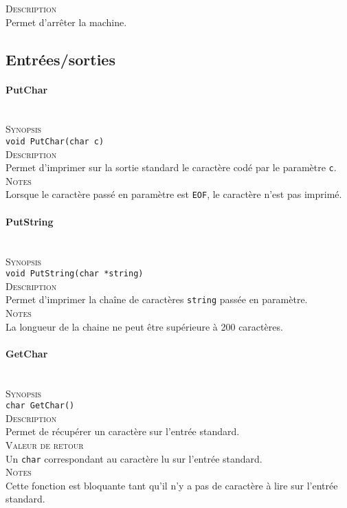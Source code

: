 \documentclass{report}
\newcommand{\myparagraph}[1]{\paragraph*{#1}\mbox{}\\}
\begin{document}
\textsc{Description}\\
	Permet d'arrêter la machine.\\

\subsection*{Entrées/sorties}
\myparagraph{PutChar}

\textsc{Synopsis}\\ 
	\texttt{void PutChar(char c)}\\
	
\textsc{Description}\\
	Permet d'imprimer sur la sortie standard le caractère codé par le paramètre \texttt{c}.\\
	
\textsc{Notes}\\
	Lorsque le caractère passé en paramètre est \texttt{EOF}, le caractère n'est pas imprimé.




\myparagraph{PutString}

\textsc{Synopsis}\\
	\texttt{void PutString(char *string)}\\
	
\textsc{Description}\\
	Permet d'imprimer la chaîne de caractères \texttt{string} passée en paramètre.\\
	
\textsc{Notes}\\
	La longueur de la chaine ne peut être supérieure à 200 caractères.


\myparagraph{GetChar}

\textsc{Synopsis}\\
	\texttt{char GetChar()}\\
	
\textsc{Description}\\
	Permet de récupérer un caractère sur l'entrée standard.\\
	
\textsc{Valeur de retour}\\
	Un \texttt{char} correspondant au caractère lu sur l'entrée standard.\\
	
\textsc{Notes}\\
	Cette fonction est bloquante tant qu'il n'y a pas de caractère à lire sur l'entrée standard.
	
\end{document}
